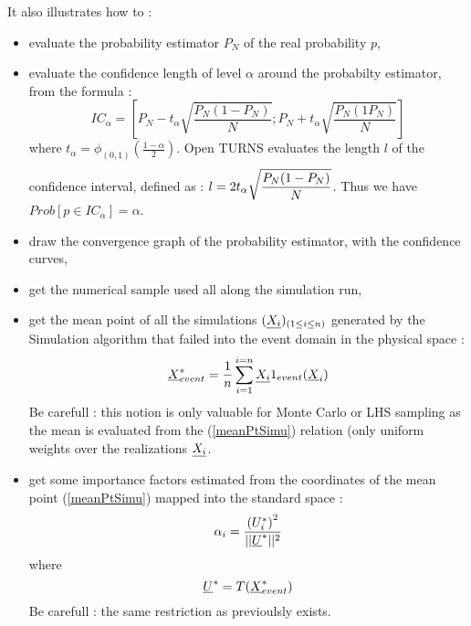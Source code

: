 It also illustrates how to  :
\begin{itemize}
\item evaluate the probability estimator $P_N$ of the real probability $p$,
\item evaluate the confidence length of level $\alpha$ around the probabilty estimator, from the formula :
  $$
  IC_\alpha = [P_N - t_{\alpha}\sqrt{\frac{P_N(1-P_N)}{N}}; P_N + t_{\alpha}\sqrt{\frac{P_N(1P_N)}{N}}]
  $$
  where $t_{\alpha} = \phi_{(0,1)}(\frac{1-\alpha}{2})$. Open TURNS evaluates the length $l$ of the confidence interval, defined as : $\displaystyle l = 2t_{\alpha}\sqrt{\frac{P_N(1-P_N)}{N}}^{\strut}$. Thus we have $Prob[p \in IC_\alpha] = \alpha$.
\item draw the convergence graph of the probability estimator, with the confidence curves,
\item get the numerical sample used all along the simulation run,
\item get the mean point  of all the simulations $ ({\underline{X_i}})_{(1\leq i \leq n)}$ generated by the Simulation algorithm that failed into the event domain in the physical space : 
\begin{equation}\label{meanPtSimu}
{\underline{X}}^*_{event} = \displaystyle \frac{1}{n} \sum_{i=1}^{i=n} {\underline{X_i}}1_{event}({\underline{X}}_i)
\end{equation}
Be carefull : this notion is only valuable for Monte Carlo or LHS sampling as the mean is evaluated from the (\ref{meanPtSimu}) relation (only uniform weights over the realizations ${\underline{X_i}}$. 
\item get some importance factors estimated from the coordinates of the mean point (\ref{meanPtSimu}) mapped into the standard space :
\begin{equation}\label{impFctSimu}
\alpha_i = \displaystyle \frac{\left(U_{i}^*\right)^2}{||{\underline{U}}^*||^2}
\end{equation}
where 
\begin{equation}\label{meanPtSimuStdSpace}
{\underline{U}}^* = T({\underline{X}}^*_{event})
\end{equation}
Be carefull : the same restriction as previoulsly exists.
\end{itemize}




